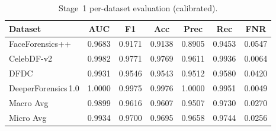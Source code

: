 \begin{table}[h]
  \centering
  \caption{Stage~1 per-dataset evaluation (calibrated).}\label{tab:stage1_per_dataset}
  {\small
  \begin{tabular}{lcccccc}\toprule
  Dataset & AUC & F1 & Acc & Prec & Rec & FNR \\ \midrule
  FaceForensics++ & 0.9683 & 0.9171 & 0.9138 & 0.8905 & 0.9453 & 0.0547 \\
  CelebDF-v2 & 0.9982 & 0.9771 & 0.9769 & 0.9611 & 0.9936 & 0.0064 \\
  DFDC & 0.9931 & 0.9546 & 0.9543 & 0.9512 & 0.9580 & 0.0420 \\
  DeeperForensics\,1.0 & 1.0000 & 0.9975 & 0.9976 & 1.0000 & 0.9951 & 0.0049 \\ 
  \midrule
  Macro Avg & 0.9899 & 0.9616 & 0.9607 & 0.9507 & 0.9730 & 0.0270 \\ 
  Micro Avg & 0.9934 & 0.9700 & 0.9695 & 0.9658 & 0.9744 & 0.0256 \\ 
  \bottomrule
  \end{tabular}}
\end{table}
